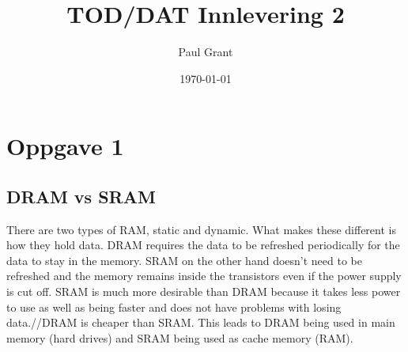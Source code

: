 \documentclass[a4paper]{article}
\begin{document}
\title{TOD/DAT Innlevering 2}
\author{Paul Grant}
\date{\today}
\maketitle

\section*{Oppgave 1}{
  \subsection*{DRAM vs SRAM}{
    There are two types of RAM, static and dynamic. What makes these different is how they hold data. DRAM requires the data to be refreshed periodically for the data to stay in the memory. SRAM on the other hand doesn't need to be refreshed and the memory remains inside the transistors even if the power supply is cut off. SRAM is much more desirable than DRAM because it takes less power to use as well as being faster and does not have problems with losing data.//DRAM is cheaper than SRAM. This leads to DRAM being used in main memory (hard drives) and SRAM being used as cache memory (RAM).
  }
}
\end{document}
